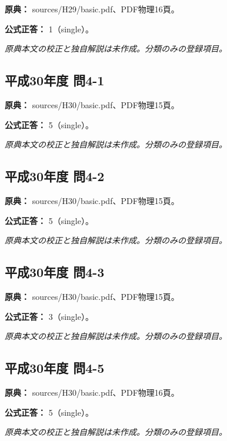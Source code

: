\noindent\textbf{原典：} sources/H29/basic.pdf、PDF物理16頁。

\textbf{公式正答：} 1（single）。

\par\textit{原典本文の校正と独自解説は未作成。分類のみの登録項目。}

\subsection{平成30年度 問4-1}
\label{q:h30-reg-basic-4-1}

\noindent\textbf{原典：} sources/H30/basic.pdf、PDF物理15頁。

\textbf{公式正答：} 5（single）。

\par\textit{原典本文の校正と独自解説は未作成。分類のみの登録項目。}

\subsection{平成30年度 問4-2}
\label{q:h30-reg-basic-4-2}

\noindent\textbf{原典：} sources/H30/basic.pdf、PDF物理15頁。

\textbf{公式正答：} 5（single）。

\par\textit{原典本文の校正と独自解説は未作成。分類のみの登録項目。}

\subsection{平成30年度 問4-3}
\label{q:h30-reg-basic-4-3}

\noindent\textbf{原典：} sources/H30/basic.pdf、PDF物理15頁。

\textbf{公式正答：} 3（single）。

\par\textit{原典本文の校正と独自解説は未作成。分類のみの登録項目。}

\subsection{平成30年度 問4-5}
\label{q:h30-reg-basic-4-5}

\noindent\textbf{原典：} sources/H30/basic.pdf、PDF物理16頁。

\textbf{公式正答：} 5（single）。

\par\textit{原典本文の校正と独自解説は未作成。分類のみの登録項目。}

